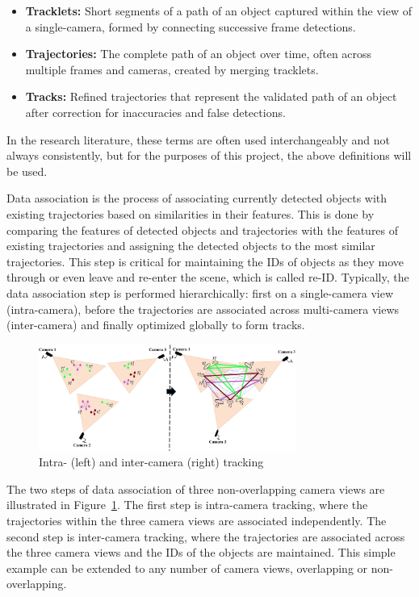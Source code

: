 \begin{itemize}
    \item \textbf{Tracklets:} Short segments of a path of an object captured within the view of a single-camera, formed by connecting successive frame detections.
    \item \textbf{Trajectories:} The complete path of an object over time, often across multiple frames and cameras, created by merging tracklets.
    \item \textbf{Tracks:} Refined trajectories that represent the validated path of an object after correction for inaccuracies and false detections.
\end{itemize}

In the research literature, these terms are often used interchangeably and not always consistently, but for the purposes of this project, the above definitions will be used.

Data association is the process of associating currently detected objects with existing trajectories based on similarities in their features. This is done by comparing the features of detected objects and trajectories with the features of existing trajectories and assigning the detected objects to the most similar trajectories. This step is critical for maintaining the IDs of objects as they move through or even leave and re-enter the scene, which is called re-ID. Typically, the data association step is performed hierarchically: first on a single-camera view (intra-camera), before the trajectories are associated across multi-camera views (inter-camera) and finally optimized globally to form tracks.

\begin{figure}[ht]
    \centering
    \includegraphics[width=0.75\textwidth]{resources/fig/Tesfaye19-intra_inter_camera_tracking.png}
    \caption[Intra- and inter-camera tracking]{Intra- (left) and inter-camera (right) tracking~\cite[source image:][Fig.~1]{Tesfaye19}}\label{fig:intra_inter_camera_tracking}
\end{figure}

The two steps of data association of three non-overlapping camera views are illustrated in Figure~\ref{fig:intra_inter_camera_tracking}. The first step is intra-camera tracking, where the trajectories within the three camera views are associated independently. The second step is inter-camera tracking, where the trajectories are associated across the three camera views and the IDs of the objects are maintained. This simple example can be extended to any number of camera views, overlapping or non-overlapping.


